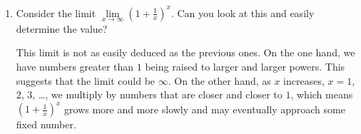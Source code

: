 \documentclass[main]{subfiles}
\begin{document}
\begin{enumerate}[resume]
\begin{solution}
\begin{enumerate}
\end{enumerate}
\end{solution}




\item
\begin{problem}[\nstretch{1.5}]
  Consider the limit $\lim\limits_{x\to\infty} (1+\frac{1}{x})^x$. Can you 
  look at this and easily determine the value?
\end{problem}

\begin{solution}
  This limit is not as easily deduced as the previous ones. On the one hand, we 
  have numbers greater than $1$ being raised to larger and larger powers. This
  suggests that the limit could be $\infty$. On the other hand, as $x$ increases,
  $x=1$, $2$, $3$, \dots , we multiply by numbers that are closer and closer to
  $1$, which means $(1+\frac{1}{x})^x$ grows more and more slowly and may
  eventually approach some fixed number.
  
\end{solution}

\end{enumerate}
\end{document}
